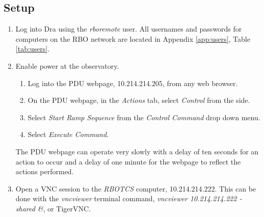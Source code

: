 \documentclass[letterpaper,12pt]{article}
\begin{document}
	\subsection{Setup}
	\begin{enumerate}
		\item Log into Dra using the \textit{rboremote} user. All usernames and passwords for computers on the RBO network are located in Appendix \ref{app:users}, Table \ref{tab:users}.
		\item Enable power at the observatory.
			\begin{enumerate}
				\item Log into the PDU webpage, 10.214.214.205, from any web browser.
				\item On the PDU webpage, in the \textit{Actions} tab, select \textit{Control} from the side.
				\item Select \textit{Start Ramp Sequence} from the \textit{Control Command} drop down menu.
				\item Select \textit{Execute Command}.
			\end{enumerate}
		The PDU webpage can operate very slowly with a delay of ten seconds for an action to occur and a delay of one minute for the webpage to reflect the actions performed.
		\item Open a VNC session to the \textit{RBOTCS} computer, 10.214.214.222. This can be done with the \textit{vncviewer} terminal command, \textit{vncviewer 10.214.214.222 -shared \&}, or TigerVNC.
	\end{enumerate}
	
\end{document}
